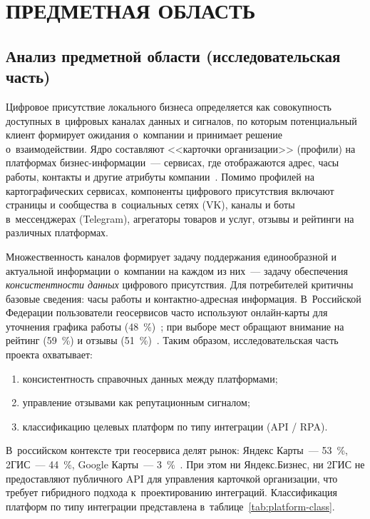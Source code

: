 \chapter{{\fontsize{14pt}{21pt}\selectfont\MakeUppercase{Предметная область}}}
\label{ch:subject-area}

\section{Анализ предметной области (исследовательская часть)}

Цифровое присутствие локального бизнеса определяется как совокупность доступных в~цифровых каналах данных и сигналов, по которым потенциальный клиент формирует ожидания о~компании и принимает решение о~взаимодействии. Ядро составляют <<карточки организации>> (профили) на платформах бизнес-информации~--- сервисах, где отображаются адрес, часы работы, контакты и другие атрибуты компании~\cite{src:4, src:3}. Помимо профилей на картографических сервисах, компоненты цифрового присутствия включают страницы и сообщества в~социальных сетях (VK), каналы и боты в~мессенджерах (Telegram), агрегаторы товаров и услуг, отзывы и рейтинги на различных платформах.

Множественность каналов формирует задачу поддержания единообразной и актуальной информации о~компании на каждом из них~--- задачу обеспечения \textit{консистентности данных} цифрового присутствия. Для потребителей критичны базовые сведения: часы работы и контактно-адресная информация. В~Российской Федерации пользователи геосервисов часто используют онлайн-карты для уточнения графика работы (48~\%)~\cite{src:35}; при выборе мест обращают внимание на рейтинг (59~\%) и отзывы (51~\%)~\cite{src:35}. Таким образом, исследовательская часть проекта охватывает:

\begin{enumerate}
  \item консистентность справочных данных между платформами;
  \item управление отзывами как репутационным сигналом;
  \item классификацию целевых платформ по типу интеграции (API / RPA).
\end{enumerate}

В~российском контексте три геосервиса делят рынок: Яндекс Карты~--- 53~\%, 2ГИС~--- 44~\%, Google Карты~--- 3~\%~\cite{src:35}. При этом ни Яндекс.Бизнес, ни 2ГИС не предоставляют публичного API для управления карточкой организации, что требует гибридного подхода к~проектированию интеграций. Классификация платформ по типу интеграции представлена в~таблице~\ref{tab:platform-class}.

